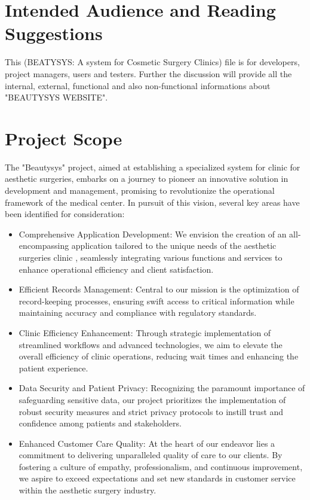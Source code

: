 \documentclass{scrreprt}
\begin{document}
\section{Intended Audience and Reading Suggestions}
This (BEATYSYS: A system for Cosmetic Surgery Clinics) file is for developers, project managers, users and testers. Further the discussion will provide all the internal, external, functional and also non-functional informations about "BEAUTYSYS WEBSITE".

\section{Project Scope}
The "Beautysys" project, aimed at establishing a specialized system for clinic for aesthetic surgeries, embarks on a journey to pioneer an innovative solution in development and management, promising to revolutionize the operational framework of the medical center. In pursuit of this vision, several key areas have been identified for consideration:

\begin{itemize}
    \item Comprehensive Application Development: We envision the creation of an all-encompassing application tailored to the unique needs of the aesthetic surgeries clinic , seamlessly integrating various functions and services to enhance operational efficiency and client satisfaction.

    \item Efficient Records Management: Central to our mission is the optimization of record-keeping processes, ensuring swift access to critical information while maintaining accuracy and compliance with regulatory standards.

    \item Clinic Efficiency Enhancement: Through strategic implementation of streamlined workflows and advanced technologies, we aim to elevate the overall efficiency of clinic operations, reducing wait times and enhancing the patient experience.

    \item Data Security and Patient Privacy: Recognizing the paramount importance of safeguarding sensitive data, our project prioritizes the implementation of robust security measures and strict privacy protocols to instill trust and confidence among patients and stakeholders.

    \item Enhanced Customer Care Quality: At the heart of our endeavor lies a commitment to delivering unparalleled quality of care to our clients. By fostering a culture of empathy, professionalism, and continuous improvement, we aspire to exceed expectations and set new standards in customer service within the aesthetic surgery industry.
\end{itemize}
\end{document}
